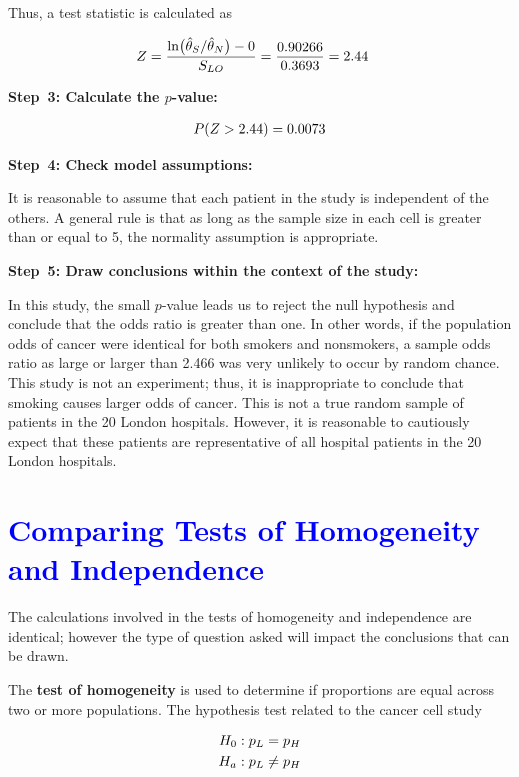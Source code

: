 \documentclass[
]{report}
\begin{document}
Thus, a test statistic is calculated as

\begin{align}
Z 
&= \frac{\ln\bigl(\hat\theta_S / \hat\theta_N\bigr) - 0}{S_{LO}}
= \frac{0.90266}{0.3693} = 2.44 \notag
\end{align}

\textbf{Step~3: Calculate the \(\scriptstyle p\)-value:}

\begin{align}
P(Z > 2.44) = 0.0073 
\notag
\end{align}

\textbf{Step~4: Check model assumptions:}

It is reasonable to assume that each patient in the study is independent of the others. A general rule is that as long as the sample size in each cell is greater than or equal to 5, the normality assumption is appropriate.

\textbf{Step~5: Draw conclusions within the context of the study:}

In this study, the small \(\scriptstyle p\)-value leads us to reject the null hypothesis and conclude that the odds ratio is greater than one. In other words, if the population odds of cancer were identical for both smokers and nonsmokers, a sample odds ratio as large or larger than 2.466 was very unlikely to occur by random chance. This study is not an experiment; thus, it is inappropriate to conclude that smoking causes larger odds of cancer. This is not a true random sample of patients in the 20 London hospitals. However, it is reasonable to cautiously expect that these patients are representative of all hospital patients in the 20 London hospitals.

\hypertarget{section-57}{%
\section{\texorpdfstring{\textcolor{blue}{Comparing Tests of Homogeneity and Independence}}{}}\label{section-57}}

The calculations involved in the tests of homogeneity and independence are identical; however the type of question asked will impact the conclusions that can be drawn.

The \textbf{test of homogeneity} is used to determine if proportions are equal across two or more populations. The hypothesis test related to the cancer cell study

\begin{align}
H_0: p_L &= p_H \notag \\ 
H_a: p_L &\neq p_H \notag
\end{align}
\end{document}
